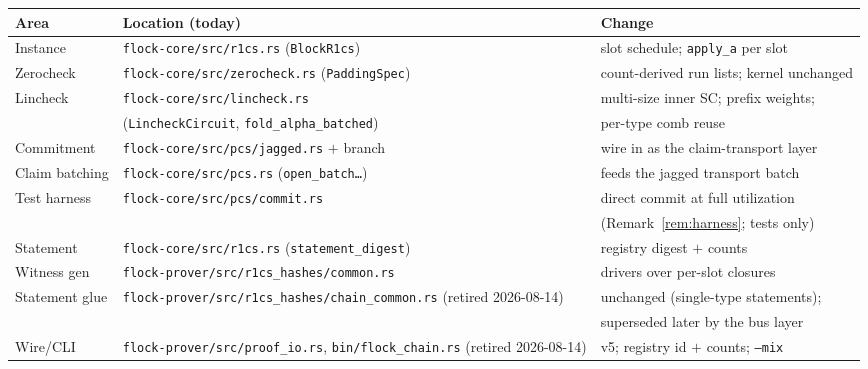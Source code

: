 \documentclass[11pt]{article}
\newcommand{\code}[1]{\texttt{#1}}
\theoremstyle{definition}
\begin{document}
\begin{center}
\small
\begin{tabular}{@{}lll@{}}
\toprule
\textbf{Area} & \textbf{Location (today)} & \textbf{Change} \\
\midrule
Instance & \code{flock-core/src/r1cs.rs} (\code{BlockR1cs}) & slot schedule; \code{apply\_a} per slot \\
Zerocheck & \code{flock-core/src/zerocheck.rs} (\code{PaddingSpec}) & count-derived run lists; kernel unchanged \\
Lincheck & \code{flock-core/src/lincheck.rs} & multi-size inner SC; prefix weights; \\
 & (\code{LincheckCircuit}, \code{fold\_alpha\_batched}) & per-type comb reuse \\
Commitment & \code{flock-core/src/pcs/jagged.rs} $+$ branch & wire in as the claim-transport layer \\
Claim batching & \code{flock-core/src/pcs.rs} (\code{open\_batch\ldots}) & feeds the jagged transport batch \\
Test harness & \code{flock-core/src/pcs/commit.rs} & direct commit at full utilization \\
 & & (Remark~\ref{rem:harness}; tests only) \\
Statement & \code{flock-core/src/r1cs.rs} (\code{statement\_digest}) & registry digest $+$ counts \\
Witness gen & \code{flock-prover/src/r1cs\_hashes/common.rs} & drivers over per-slot closures \\
Statement glue & \code{flock-prover/src/r1cs\_hashes/chain\_common.rs} (retired 2026-08-14) & unchanged (single-type statements); \\
 & & superseded later by the bus layer \\
Wire/CLI & \code{flock-prover/src/proof\_io.rs}, \code{bin/flock\_chain.rs} (retired 2026-08-14) & v5; registry id $+$ counts; \code{--mix} \\
\bottomrule
\end{tabular}
\end{center}
\end{document}
